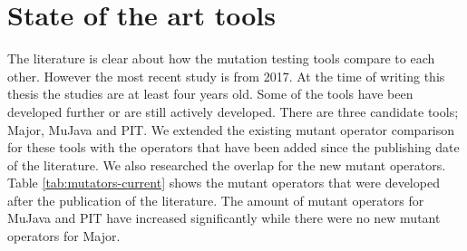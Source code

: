 \documentclass[../main]{subfiles}
\begin{document}
\section{State of the art tools}
The literature is clear about how the mutation testing tools compare to each other.
However the most recent study is from 2017.
At the time of writing this thesis the studies are at least four years old. 
Some of the tools have been developed further or are still actively developed\cite{pit-releases,Major}.
\newline
There are three candidate tools; Major,  MuJava and PIT.
We extended the existing mutant operator comparison for these tools with the operators that have been added since the publishing date of the literature.
We also researched the overlap for the new mutant operators.
Table \ref{tab:mutators-current} shows the mutant operators that were developed after the publication of the literature. The amount of mutant operators for  MuJava and PIT have increased significantly while there were no new mutant operators for Major.
\end{document}

